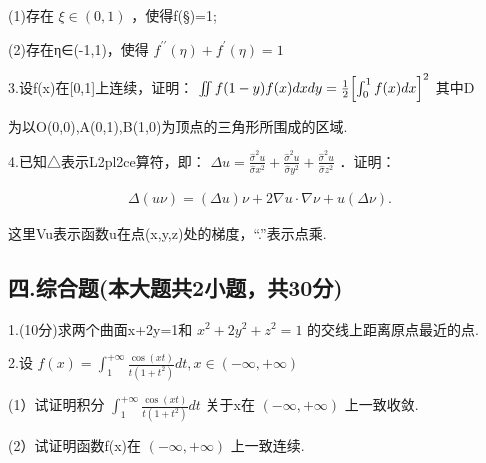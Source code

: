 \documentclass[11pt,fontset=fandol]{ctexart}
\begin{document}
(1)存在 \(\xi \in ( 0 , 1 )\) ，使得f(§)=1;

(2)存在η∈(-1,1)，使得
\(f ^ { \prime \prime } ( \eta ) + f ^ { \prime } ( \eta ) = 1\)

3.设f(x)在{[}0,1{]}上连续，证明：
\(\iint f ( 1 - y ) f ( x ) d x d y = \frac { 1 } { 2 } \Bigl [ \int _ { 0 } ^ { 1 } f ( x ) d x \Bigr ] ^ { 2 }\)
其中D

为以O(0,0),A(0,1),B(1,0)为顶点的三角形所围成的区域.

4.已知△表示L2pl2ce算符，即：
\(\Delta u = \frac { \hat { \sigma } ^ { 2 } u } { \hat { \sigma } { x } ^ { 2 } } + \frac { \hat { \sigma } ^ { 2 } u } { \hat { \sigma } { y } ^ { 2 } } + \frac { \hat { \sigma } ^ { 2 } u } { \hat { \sigma } { z } ^ { 2 } }\)
．证明：

\[
\begin{array} { r } { \Delta ( u \nu ) = ( \Delta u ) \nu + 2 \nabla u \cdot \nabla \nu + u ( \Delta \nu ) . } \end{array}
\]

这里Vu表示函数u在点(x,y,z)处的梯度，``.''表示点乘.

\subsection{四.综合题(本大题共2小题，共30分)}\label{ux56db.ux7efcux5408ux9898ux672cux5927ux9898ux51712ux5c0fux9898ux517130ux5206}

1.(10分)求两个曲面x+2y=1和 \(x ^ { 2 } + 2 y ^ { 2 } + z ^ { 2 } = 1\)
的交线上距离原点最近的点.

2.设
\(f ( x ) = \int _ { 1 } ^ { + \infty } \frac { \cos ( x t ) } { t ( 1 + t ^ { 2 } ) } d t , x \in ( - \infty , + \infty )\)

(1）试证明积分
\(\int _ { 1 } ^ { + \infty } \frac { \cos ( x t ) } { t ( 1 + t ^ { 2 } ) } d t\)
关于x在 \(( - \infty , + \infty )\) 上一致收敛.

(2）试证明函数f(x)在 \(( - \infty , + \infty )\) 上一致连续.
\end{document}
